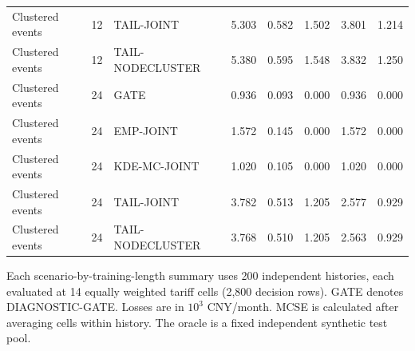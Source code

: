 \begin{table}[tbp]
\begin{tabular}{@{}llllllll@{}}
Clustered events & 12 & TAIL-JOINT & 5.303 & 0.582 & 1.502 & 3.801 & 1.214\\
Clustered events & 12 & TAIL-NODECLUSTER & 5.380 & 0.595 & 1.548 & 3.832 & 1.250\\
Clustered events & 24 & GATE & 0.936 & 0.093 & 0.000 & 0.936 & 0.000\\
Clustered events & 24 & EMP-JOINT & 1.572 & 0.145 & 0.000 & 1.572 & 0.000\\
Clustered events & 24 & KDE-MC-JOINT & 1.020 & 0.105 & 0.000 & 1.020 & 0.000\\
Clustered events & 24 & TAIL-JOINT & 3.782 & 0.513 & 1.205 & 2.577 & 0.929\\
Clustered events & 24 & TAIL-NODECLUSTER & 3.768 & 0.510 & 1.205 & 2.563 & 0.929\\
\bottomrule
\end{tabular}
\par\smallskip\noindent\begin{minipage}{\linewidth}\footnotesize Each scenario-by-training-length summary uses 200 independent histories, each evaluated at 14 equally weighted tariff cells (2,800 decision rows). GATE denotes DIAGNOSTIC-GATE. Losses are in $10^3$ CNY/month. MCSE is calculated after averaging cells within history. The oracle is a fixed independent synthetic test pool.\end{minipage}
\end{table}
\endgroup
